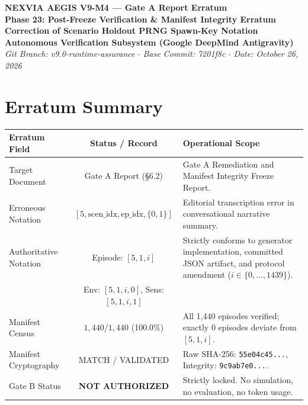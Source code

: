 \documentclass[10pt,a4paper]{article}
\begin{document}
\begin{center}
    {\LARGE \textbf{NEXVIA AEGIS V9-M4 — Gate A Report Erratum}}\\[6pt]
    {\Large \textbf{Phase 23: Post-Freeze Verification \& Manifest Integrity Erratum}}\\[3pt]
    {\large \textbf{Correction of Scenario Holdout PRNG Spawn-Key Notation}}\\[10pt]
    \textbf{Autonomous Verification Subsystem (Google DeepMind Antigravity)}\\
    \textit{Git Branch: v9.0-runtime-assurance \quad $\cdot$ \quad Base Commit: 7201f8c \quad $\cdot$ \quad Date: October 26, 2026}\\[12pt]
\end{center}

\noindent{}

\vspace{10pt}

\section{Erratum Summary}

\begin{table}[h!]
\centering
\small
\begin{tabularx}{\textwidth}{l c X}
\toprule
\textbf{Erratum Field} & \textbf{Status / Record} & \textbf{Operational Scope} \\
\midrule
Target Document & Gate A Report (§6.2) & Gate A Remediation and Manifest Integrity Freeze Report. \\
\addlinespace
Erroneous Notation & $[5, \text{scen\_idx}, \text{ep\_idx}, \{0, 1\}]$ & Editorial transcription error in conversational narrative summary. \\
\addlinespace
Authoritative Notation & Episode: $[5, 1, i]$ & Strictly conforms to generator implementation, committed JSON artifact, and protocol amendment ($i \in \{0, \dots, 1439\}$). \\
& Env: $[5, 1, i, 0]$, Sens: $[5, 1, i, 1]$ & \\
\addlinespace
Manifest Census & $1{,}440 / 1{,}440$ (100.0\%) & All 1,440 episodes verified; exactly 0 episodes deviate from $[5, 1, i]$. \\
\addlinespace
Manifest Cryptography & MATCH / VALIDATED & Raw SHA-256: \texttt{55e04c45...}, Integrity: \texttt{9c9ab7e0...}. \\
\addlinespace
Gate B Status & \textbf{NOT AUTHORIZED} & Strictly locked. No simulation, no evaluation, no token usage. \\
\bottomrule
\end{tabularx}
\end{table}
\end{document}
